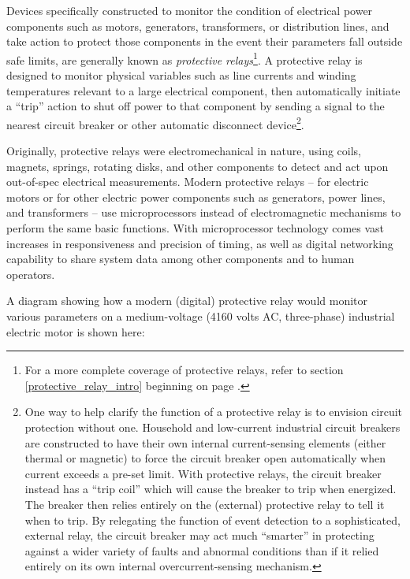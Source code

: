 Devices specifically constructed to monitor the condition of electrical power components such as motors, generators, transformers, or distribution lines, and take action to protect those components in the event their parameters fall outside safe limits, are generally known as \textit{protective relays}\footnote{For a more complete coverage of protective relays, refer to section \ref{protective_relay_intro} beginning on page \pageref{protective_relay_intro}.}.  A protective relay is designed to monitor physical variables such as line currents and winding temperatures relevant to a large electrical component, then automatically initiate a ``trip'' action to shut off power to that component by sending a signal to the nearest circuit breaker or other automatic disconnect device\footnote{One way to help clarify the function of a protective relay is to envision circuit protection without one.  Household and low-current industrial circuit breakers are constructed to have their own internal current-sensing elements (either thermal or magnetic) to force the circuit breaker open automatically when current exceeds a pre-set limit.  With protective relays, the circuit breaker instead has a ``trip coil'' which will cause the breaker to trip when energized.  The breaker then relies entirely on the (external) protective relay to tell it when to trip.  By relegating the function of event detection to a sophisticated, external relay, the circuit breaker may act much ``smarter'' in protecting against a wider variety of faults and abnormal conditions than if it relied entirely on its own internal overcurrent-sensing mechanism.}.  

Originally, protective relays were electromechanical in nature, using coils, magnets, springs, rotating disks, and other components to detect and act upon out-of-spec electrical measurements.  Modern protective relays -- for electric motors or for other electric power components such as generators, power lines, and transformers -- use microprocessors instead of electromagnetic mechanisms to perform the same basic functions.  With microprocessor technology comes vast increases in responsiveness and precision of timing, as well as digital networking capability to share system data among other components and to human operators.

\filbreak

A diagram showing how a modern (digital) protective relay would monitor various parameters on a medium-voltage (4160 volts AC, three-phase) industrial electric motor is shown here:

